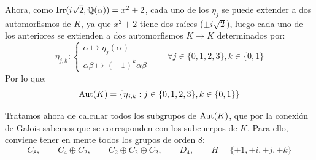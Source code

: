 \begin{ejemplo}
    Ahora, como $\operatorname{Irr}(i\sqrt{2},\mathbb{Q}(\alpha)) = x^2+2$, cada uno de los $\eta_j$ se puede extender a dos automorfismos de $K$, ya que $x^2+2$ tiene dos raíces ($\pm i\sqrt{2}$), luego cada uno de los anteriores se extienden a dos automorfismos $K\to K$ determinados por:
    \begin{equation*}
        \eta_{j,k} : \left\{\begin{array}{l}
            \alpha\longmapsto \eta_j(\alpha) \\
            \alpha\beta \longmapsto {(-1)}^{k}\alpha\beta
        \end{array}\right. \qquad \forall j \in \{0,1,2,3\}, k \in \{0,1\}
    \end{equation*}
    Por lo que:
    \begin{equation*}
        \operatorname{Aut}(K) = \{\eta_{j,k} : j \in \{0,1,2,3\}, k \in \{0,1\}\}
    \end{equation*}

    Tratamos ahora de calcular todos los subgrupos de $\operatorname{Aut}(K)$, que por la conexión de Galois sabemos que se corresponden con los subcuerpos de $K$. Para ello, conviene tener en mente todos los grupos de orden 8:
    \begin{equation*}
        C_8,\qquad  C_4\oplus C_2,\qquad C_2\oplus C_2\oplus C_2, \qquad D_4,\qquad H=\{\pm1,\pm i,\pm j,\pm k\}
    \end{equation*}


\end{ejemplo}
